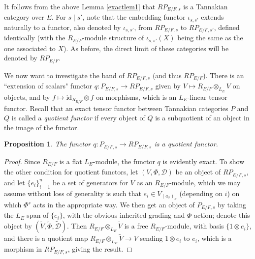 \documentclass[11pt]{amsart}
\newtheorem{prop}[thm]{Proposition}
\theoremstyle{definition}
\begin{document}
It follows from the above Lemma \ref{exactlem1} that $RP_{E/F,s}$ is a Tannakian category over $E$. For $s \mid s'$, note that the embedding functor $\iota_{s,s'}$ extends naturally to a functor, also denoted by $\iota_{s,s'}$, from $RP_{E/F,s}$ to $RP_{E/F,s'}$, defined identically (with the $R_{E/F}$-module structure of $\iota_{s,s'}(X)$ being the same as the one associated to $X$). As before, the direct limit of these categories will be denoted by $RP_{E/F}.$

We now want to investigate the band of $RP_{E/F,s}$ (and thus $RP_{E/F}$). There is an ``extension of scalars" functor $q \colon P_{E/F,s} \to RP_{E/F,s}$ given by $V \mapsto R_{E/F} \otimes_{L_{E}} V$ on objects, and by $f \mapsto \text{id}_{R_{E/F}} \otimes f$ on morphisms, which is an $L_{E}$-linear tensor functor. Recall that an exact tensor functor between Tannakian categories $P$ and $Q$ is called a \textit{quotient functor} if every object of $Q$ is a subquotient of an object in the image of the functor. 

\begin{prop} The functor $q \colon P_{E/F,s} \to RP_{E/F,s}$ is a quotient functor.
\end{prop}

\begin{proof} Since $R_{E/F}$ is a flat $L_{E}$-module, the functor $q$ is evidently exact. To show the other condition for quotient functors, let $(V, \Phi, \mathcal{D})$ be an object of $RP_{E/F,s}$, and let $\{e_{i}\}_{i=1}^{n}$ be a set of generators for $V$ as an $R_{E/F}$-module, which we may assume without loss of generality is such that $e_{i} \in V_{(a_{\sigma})_{\sigma}}$ (depending on $i$) on which $\Phi^{s}$ acts in the appropriate way. We then get an object of $P_{E/F,s}$ by taking the $L_{E}$-span of $\{e_{i}\}$, with the obvious inherited grading and $\Phi$-action; denote this object by $(\tilde{V}, \tilde{\Phi}, \tilde{\mathcal{D}})$. Then $R_{E/F} \otimes_{L_{E}} \tilde{V}$ is a free $R_{E/F}$-module, with basis $\{1 \otimes e_{i}\}$, and there is a quotient map $R_{E/F} \otimes_{L_{E}} \tilde{V} \to V$ sending $1 \otimes e_{i}$ to $e_{i}$, which is a morphism in $RP_{E/F,s}$, giving the result.
\end{proof}
\end{document}
